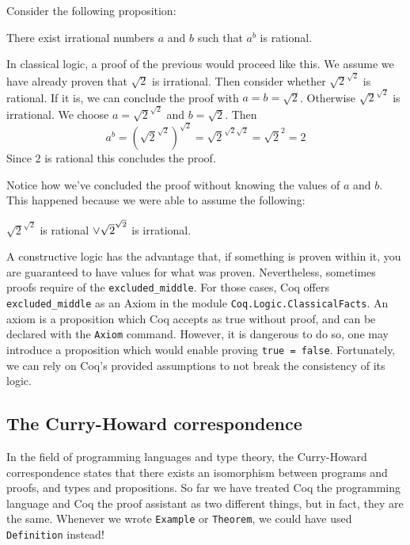 Consider the following proposition:
\begin{center}
There exist irrational numbers $a$ and $b$ such that $a^b$ is rational.
\end{center}
In classical logic, a proof of the previous would proceed like this. We assume we have already proven that
$\sqrt{2}$ is irrational. Then consider whether $\sqrt{2}^{\sqrt{2}}$ is rational. If it is, we can conclude
the proof with $a = b = \sqrt{2}$. Otherwise $\sqrt{2}^{\sqrt{2}}$ is irrational. We choose $a = \sqrt{2}^
{\sqrt{2}}$ and $b = \sqrt{2}$. Then
$$
a^b = \left(\sqrt{2}^{\sqrt{2}}\right)^{\sqrt{2}} = \sqrt{2}^{\sqrt{2}\sqrt{2}} = \sqrt{2} ^ 2 = 2
$$
\noindent Since $2$ is rational this concludes the proof.

Notice how we've concluded the proof without knowing the values of $a$ and $b$. This happened because we
were able to assume the following: 
\begin{center}
$\sqrt{2}^{\sqrt{2}}$ is rational ${\Large{\vee}} \sqrt{2}^{\sqrt{2}}$ is  irrational.
\end{center}
\noindent A constructive logic has the advantage that, if something is proven within it, you are 
guaranteed to have values for what was proven. Nevertheless, sometimes proofs require of the 
\texttt{excluded_middle}. For those cases, Coq offers \texttt{excluded_middle}
as an Axiom in the module \texttt{Coq.Logic.ClassicalFacts}. An axiom is a proposition
which Coq accepts as true without proof, and can be declared with the \texttt{Axiom}
command. However, it is dangerous to do so, one may introduce a proposition which would enable 
proving \texttt{true = false}. Fortunately, we can rely on Coq's provided assumptions to
not break the consistency of its logic.


\subsection{The Curry-Howard correspondence}
\label{sect:curry-howard}

In the field of programming languages and type theory, the Curry-Howard correspondence states that there
exists an isomorphism between programs and proofs, and types and propositions. So far we have treated Coq
the programming language and Coq the proof assistant as two different things, but in fact, they are the 
same. Whenever we wrote \texttt{Example} or \texttt{Theorem}, we could have used
\texttt{Definition} instead!

